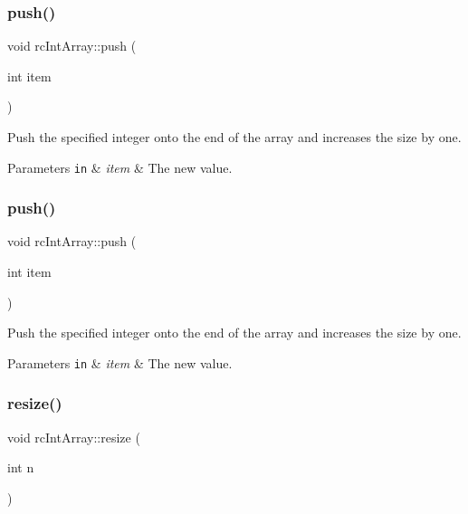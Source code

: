 \subsubsection{\texorpdfstring{push()}{push()}\hspace{0.1cm}{\footnotesize\ttfamily [1/2]}}
{\footnotesize\ttfamily void rc\+Int\+Array\+::push (\begin{DoxyParamCaption}\item[{int}]{item }\end{DoxyParamCaption})\hspace{0.3cm}{\ttfamily [inline]}}

Push the specified integer onto the end of the array and increases the size by one. 
\begin{DoxyParams}[1]{Parameters}
\mbox{\tt in}  & {\em item} & The new value. \\
\hline
\end{DoxyParams}
\mbox{\label{classrcIntArray_ae52f6cd7ffdd2dba00f6f006853dc441}} 
\subsubsection{\texorpdfstring{push()}{push()}\hspace{0.1cm}{\footnotesize\ttfamily [2/2]}}
{\footnotesize\ttfamily void rc\+Int\+Array\+::push (\begin{DoxyParamCaption}\item[{int}]{item }\end{DoxyParamCaption})\hspace{0.3cm}{\ttfamily [inline]}}

Push the specified integer onto the end of the array and increases the size by one. 
\begin{DoxyParams}[1]{Parameters}
\mbox{\tt in}  & {\em item} & The new value. \\
\hline
\end{DoxyParams}
\mbox{\label{classrcIntArray_a2135fb43dd504939a2eadbb78650c155}} 
\subsubsection{\texorpdfstring{resize()}{resize()}\hspace{0.1cm}{\footnotesize\ttfamily [1/2]}}
{\footnotesize\ttfamily void rc\+Int\+Array\+::resize (\begin{DoxyParamCaption}\item[{int}]{n }\end{DoxyParamCaption})}

